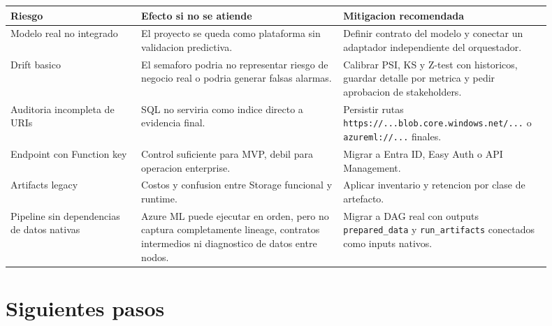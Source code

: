 \documentclass[11pt,letterpaper]{article}
\newcommand{\code}[1]{\texttt{\small #1}}
\begin{document}
\begin{longtable}{p{0.22\linewidth}p{0.34\linewidth}p{0.34\linewidth}}
\toprule
\textbf{Riesgo} & \textbf{Efecto si no se atiende} & \textbf{Mitigacion recomendada}\\
\midrule
\endhead
Modelo real no integrado & El proyecto se queda como plataforma sin validacion predictiva. & Definir contrato del modelo y conectar un adaptador independiente del orquestador.\\
Drift basico & El semaforo podria no representar riesgo de negocio real o podria generar falsas alarmas. & Calibrar PSI, KS y Z-test con historicos, guardar detalle por metrica y pedir aprobacion de stakeholders.\\
Auditoria incompleta de URIs & SQL no serviria como indice directo a evidencia final. & Persistir rutas \code{https://...blob.core.windows.net/...} o \code{azureml://...} finales.\\
Endpoint con Function key & Control suficiente para MVP, debil para operacion enterprise. & Migrar a Entra ID, Easy Auth o API Management.\\
Artifacts legacy & Costos y confusion entre Storage funcional y runtime. & Aplicar inventario y retencion por clase de artefacto.\\
Pipeline sin dependencias de datos nativas & Azure ML puede ejecutar en orden, pero no captura completamente lineage, contratos intermedios ni diagnostico de datos entre nodos. & Migrar a DAG real con outputs \code{prepared\_data} y \code{run\_artifacts} conectados como inputs nativos.\\
\bottomrule
\end{longtable}

\section*{Siguientes pasos}
\end{document}
